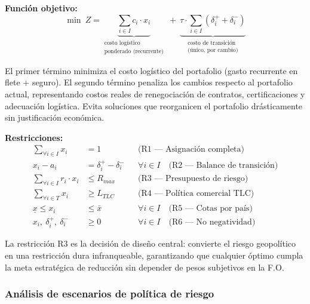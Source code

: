 \documentclass[11pt,a4paper]{article}
\begin{document}
\vspace{0.1cm}
\noindent\textbf{Función objetivo:}
\vspace{-0.1cm}
\begin{equation}
\boxed{\ \min\ Z = \underbrace{\sum_{i \in I} c_i \cdot x_i}_{\substack{\text{costo logístico} \\ \text{ponderado (recurrente)}}} \ +\ \underbrace{\tau \cdot \sum_{i \in I} \left(\delta_i^+ + \delta_i^-\right)}_{\substack{\text{costo de transición} \\ \text{(único, por cambio)}}} \ }
\label{eq:fo}
\end{equation}

El primer término minimiza el costo logístico del portafolio (gasto recurrente en flete + seguro). El segundo término penaliza los cambios respecto al portafolio actual, representando costos reales de renegociación de contratos, certificaciones y adecuación logística. Evita soluciones que reorganicen el portafolio drásticamente sin justificación económica.

\vspace{0.1cm}
\noindent\textbf{Restricciones:}
\vspace{-0.1cm}
\begin{align}
\sum_{\forall i \in I} x_i &= 1 
& &\text{(R1 --- Asignación completa)} \label{eq:r1}\\
x_i - a_i &= \delta_i^+ - \delta_i^- 
& &\forall i \in I \quad \text{(R2 --- Balance de transición)} \label{eq:r2}\\
\sum_{\forall i \in I} r_i \cdot x_i &\leq R_{max} 
& &\text{(R3 --- Presupuesto de riesgo)} \label{eq:r3}\\
\sum_{\forall i \in T} x_i &\geq L_{TLC} 
& &\text{(R4 --- Política comercial TLC)} \label{eq:r4}\\
\underline{x} \leq x_i &\leq \bar{x} 
& &\forall i \in I \quad \text{(R5 --- Cotas por país)} \label{eq:r5}\\
x_i,\ \delta_i^+,\ \delta_i^- &\geq 0 
& &\forall i \in I \quad \text{(R6 --- No negatividad)} \label{eq:r6}
\end{align}

La restricción R3 es la decisión de diseño central: convierte el riesgo geopolítico en una restricción dura infranqueable, garantizando que cualquier óptimo cumpla la meta estratégica de reducción sin depender de pesos subjetivos en la F.O.

\subsubsection{Análisis de escenarios de política de riesgo}
\end{document}
